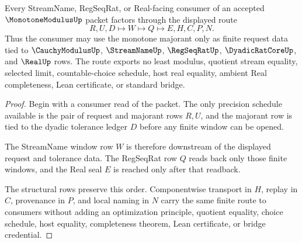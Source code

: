 \begin{theorem}
\label{thm:monotone-modulus-finite-consumer-route}
Every StreamName, RegSeqRat, or Real-facing consumer of an accepted $\MonotoneModulusUp$ packet factors through the displayed route
$$
R,U,D \longmapsto W \longmapsto Q \longmapsto E,H,C,P,N .
$$
Thus the consumer may use the monotone majorant only as finite request data tied to $\CauchyModulusUp$, $\StreamNameUp$, $\RegSeqRatUp$, $\DyadicRatCoreUp$, and $\RealUp$ rows. The route exports no least modulus, quotient stream equality, selected limit, countable-choice schedule, host real equality, ambient Real completeness, Lean certificate, or standard bridge.
\end{theorem}
\begin{proof}
Begin with a consumer read of the packet. The only precision schedule available is the pair of request and majorant rows $R,U$, and the majorant row is tied to the dyadic tolerance ledger $D$ before any finite window can be opened.

The StreamName window row $W$ is therefore downstream of the displayed request and tolerance data. The RegSeqRat row $Q$ reads back only those finite windows, and the Real seal $E$ is reached only after that readback.

The structural rows preserve this order. Componentwise transport in $H$, replay in $C$, provenance in $P$, and local naming in $N$ carry the same finite route to consumers without adding an optimization principle, quotient equality, choice schedule, host equality, completeness theorem, Lean certificate, or bridge credential.
\end{proof}


\begin{closurestatus}{\MonotoneModulusUp}
  \theoryclosure{\seedClosure}
  \formalstatus{\unformalizedV}
\end{closurestatus}
